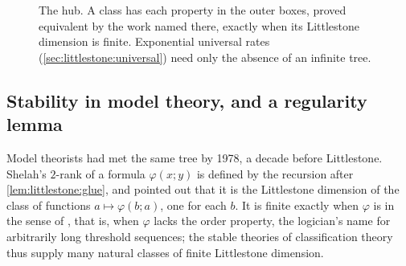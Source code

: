 \begin{refsection}
\begin{figure}[t]
\centering
{}
\caption{The hub. A class has each property in the outer boxes, proved equivalent by the work named there, exactly when its Littlestone dimension is finite. Exponential universal rates (\cref{sec:littlestone:universal}) need only the absence of an infinite tree.}\label{fig:littlestone:hub}
\end{figure}

\subsection{Stability in model theory, and a regularity lemma}\label{sec:littlestone:model}

Model theorists had met the same tree by 1978, a decade before Littlestone. Shelah's $2$-rank of a formula $\varphi(x;y)$ is defined by the recursion after \cref{lem:littlestone:glue}, and \textcite{ChaseFreitag2019} pointed out that it is the Littlestone dimension of the class of functions $a\mapsto\varphi(b;a)$, one for each $b$. It is finite exactly when $\varphi$ is  in the sense of \textcite{Shelah1978}, that is, when $\varphi$ lacks the order property, the logician's name for arbitrarily long threshold sequences; the stable theories of classification theory thus supply many natural classes of finite Littlestone dimension.


\end{refsection}
